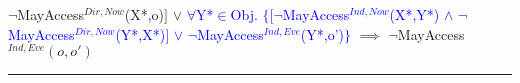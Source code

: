 \documentclass[a4paper,11pt, twoside,twocolumn]{article}
\newenvironment{logic}[1][]
{\begin{flushleft} \small }
{\end{flushleft}}
\newcommand{\loin}{$\in$}
\newcommand{\loforall}{$\forall$}
\newcommand{\loand}{$\land$}
\newcommand{\loor} {$\lor$}
\newcommand{\loimplies}{$\implies$}
\newcommand{\loneg}{$\boldsymbol \neg$}
\newcommand{\ablock} {\null\qquad}
\begin{document}
\begin{logic}
\ablock \quad \loneg MayAccess$^{Dir,Now}$(X*,o)$ ]$\linebreak
\ablock \ablock \loor \linebreak
\textcolor{blue}{
\ablock \loforall Y*\loin Obj. $\{[$\loneg MayAccess$^{Ind,Now}$(X*,Y*)\linebreak
\ablock \ablock \ablock \ablock \quad \loand \linebreak
\ablock \ablock \ablock \quad\: \loneg MayAccess$^{Dir,Now}$(Y*,X*)$]$\linebreak
\ablock \ablock \ablock \quad \loor \linebreak
\ablock \ablock \ablock \quad \loneg MayAccess$^{Ind,Eve}$(Y*,o')$\}$
}\linebreak
\ablock \loimplies\linebreak
	\ablock\loneg MayAccess$^{Ind,Eve}(o,o')$\linebreak
\hrule
\end{logic}
\end{document}
